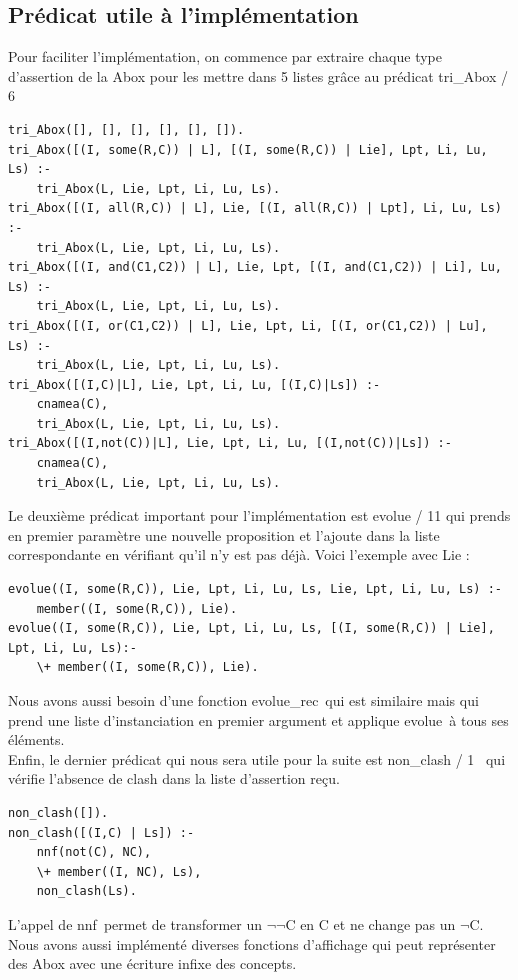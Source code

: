 \documentclass{article}
\begin{document}
\subsection{Prédicat utile à l'implémentation}
Pour faciliter l'implémentation, on commence par extraire chaque type d'assertion de la Abox pour les mettre dans 5 listes grâce au prédicat \color{blue} tri\_Abox / 6 \color{black}
\begin{verbatim}
tri_Abox([], [], [], [], [], []).
tri_Abox([(I, some(R,C)) | L], [(I, some(R,C)) | Lie], Lpt, Li, Lu, Ls) :-
    tri_Abox(L, Lie, Lpt, Li, Lu, Ls).
tri_Abox([(I, all(R,C)) | L], Lie, [(I, all(R,C)) | Lpt], Li, Lu, Ls) :-
    tri_Abox(L, Lie, Lpt, Li, Lu, Ls).
tri_Abox([(I, and(C1,C2)) | L], Lie, Lpt, [(I, and(C1,C2)) | Li], Lu, Ls) :-
    tri_Abox(L, Lie, Lpt, Li, Lu, Ls).
tri_Abox([(I, or(C1,C2)) | L], Lie, Lpt, Li, [(I, or(C1,C2)) | Lu], Ls) :-
    tri_Abox(L, Lie, Lpt, Li, Lu, Ls).
tri_Abox([(I,C)|L], Lie, Lpt, Li, Lu, [(I,C)|Ls]) :-
    cnamea(C),
    tri_Abox(L, Lie, Lpt, Li, Lu, Ls).
tri_Abox([(I,not(C))|L], Lie, Lpt, Li, Lu, [(I,not(C))|Ls]) :-
    cnamea(C),
    tri_Abox(L, Lie, Lpt, Li, Lu, Ls).
\end{verbatim}

Le deuxième prédicat important pour l'implémentation est \color{blue} evolue / 11 \color{black} qui prends en premier paramètre une nouvelle proposition et l'ajoute dans la liste correspondante en vérifiant qu'il n'y est pas déjà. Voici l'exemple avec Lie :

\begin{verbatim}
evolue((I, some(R,C)), Lie, Lpt, Li, Lu, Ls, Lie, Lpt, Li, Lu, Ls) :-
    member((I, some(R,C)), Lie).
evolue((I, some(R,C)), Lie, Lpt, Li, Lu, Ls, [(I, some(R,C)) | Lie], Lpt, Li, Lu, Ls):-
    \+ member((I, some(R,C)), Lie).
\end{verbatim}
Nous avons aussi besoin d'une fonction \color{blue}evolue\_rec\color{black}\ qui est similaire mais qui prend une liste d'instanciation en premier argument et applique \color{blue}evolue\color{black}\ à tous ses éléments.\\


Enfin, le dernier prédicat qui nous sera utile pour la suite est \color{blue} non\_clash / 1 \color{black}\ qui vérifie l'absence de clash dans la liste d'assertion reçu.
\begin{verbatim}
non_clash([]).
non_clash([(I,C) | Ls]) :-
    nnf(not(C), NC),
    \+ member((I, NC), Ls),
    non_clash(Ls).
\end{verbatim}
L'appel de \color{blue}nnf\color{black}\ permet de transformer un $\neg\neg$C en C et ne change pas un $\neg$C.
Nous avons aussi implémenté diverses fonctions d'affichage qui peut représenter des Abox avec une écriture infixe des concepts.
\end{document}
